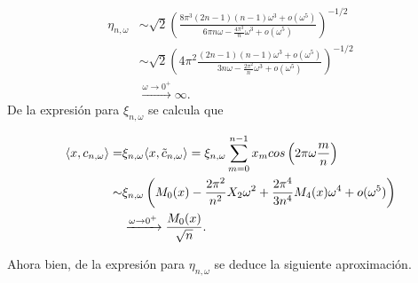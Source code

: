 \begin{align*}
\eta_{n, \omega} & \sim 
\sqrt{2} 
\left(
\frac{
8 \pi^{3} (2n-1)(n-1)\omega^{3} + o(\omega^{5})
}{
6 \pi n \omega -
\frac{4 \pi^{3}}{n} \omega^{3} + o(\omega^{5})
}
\right)^{-1/2} \\
& \sim 
\sqrt{2} 
\left(
4\pi^{2}
\frac{
(2n-1)(n-1)\omega^{3} + o(\omega^{5})
}{
3 n \omega -
\frac{2 \pi^{2}}{n} \omega^{3} + o(\omega^{5})
}
\right)^{-1/2}  \\  &
\xrightarrow{\omega \rightarrow 0^{+}} 
\infty.
\end{align*}
De la expresión para $\xi_{n, \omega}$ se calcula que

\noindent
\begin{align*}
\langle x,
c_{n, \omega}
\rangle = & 
\xi_{n, \omega} \langle x,
\tilde{c}_{n, \omega}
\rangle =  
\xi_{n, \omega} \sum\limits_{m=0}^{n-1}x_{m} cos \left(
2 \pi \omega \frac{m}{n}
\right)
\\
\sim &
\xi_{n, \omega} 
\left(
M_{0}(x) - \frac{2 \pi^{2}}{n^{2}}X_{2} \omega^{2} 
+ \frac{2 \pi^{4}}{3n^{4}} M_{4}(x) \omega^{4} + o(\omega^{5})
\right) \\ &
\xrightarrow{\omega \rightarrow 0^{+}} \frac{M_{0}(x)}{\sqrt{n}}
. \\
\end{align*}

\noindent
Ahora bien, de la expresión para
$\eta_{n, \omega}$ se deduce la siguiente aproximación.

